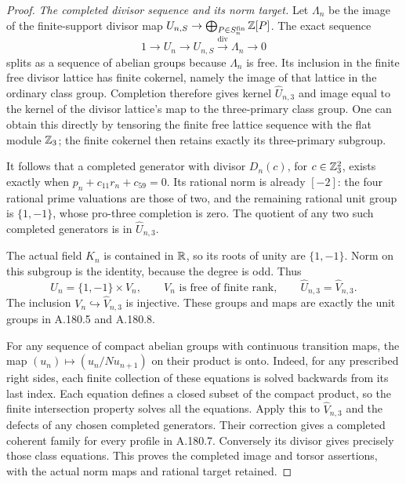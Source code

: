 \begin{proof}
\emph{The completed divisor sequence and its norm target.}
Let \(\Lambda_n\) be the image of the finite-support divisor
map \(U_{n,S}\to\bigoplus_{P\in S_n^{\rm fin}}\mathbb Z[P]\).
The exact sequence
\[
 1\longrightarrow U_n\longrightarrow U_{n,S}
                  \xrightarrow{\operatorname{div}}\Lambda_n
                  \longrightarrow0
\tag{A.180.15}
\]
splits as a sequence of abelian groups because \(\Lambda_n\)
is free.  Its inclusion in the finite free divisor lattice has
finite cokernel, namely the image of that lattice in the ordinary
class group.  Completion therefore gives kernel
\(\widehat U_{n,3}\) and image equal to the kernel of the
divisor lattice's map to the three-primary class group.  One
can obtain this directly by tensoring the finite free lattice
sequence with the flat module \(\mathbb Z_3\); the finite cokernel
then retains exactly its three-primary subgroup.

It follows that a completed generator with divisor \(D_n(c)\),
for \(c\in\mathbb Z_3^2\), exists exactly when
\(p_n+c_{11}r_n+c_{59}=0\).
Its rational norm is already \([-2]\): the four rational
prime valuations are those of two, and the remaining rational
unit group is \(\{1,-1\}\), whose pro-three completion is
zero.  The quotient of any two such completed generators is
in \(\widehat U_{n,3}\).

The actual field \(K_n\) is contained in \(\mathbb R\), so its
roots of unity are \(\{1,-1\}\).  Norm on this subgroup is
the identity, because the degree is odd.  Thus
\[
 U_n=\{1,-1\}\times V_n,
 \qquad V_n\text{ is free of finite rank},\qquad
                \widehat U_{n,3}=\widehat V_{n,3}.
\tag{A.180.16}
\]
The inclusion \(V_n\hookrightarrow\widehat V_{n,3}\)
is injective.  These groups and maps are exactly the unit
groups in A.180.5 and A.180.8.

For any sequence of compact abelian groups with continuous
transition maps, the map
\((u_n)\mapsto(u_n/Nu_{n+1})\) on their product is onto.
Indeed, for any prescribed right sides, each finite collection
of these equations is solved backwards from its last index.
Each equation defines a closed subset of the compact product,
so the finite intersection property solves all the equations.
Apply this to \(\widehat V_{n,3}\) and the defects of any
chosen completed generators.  Their correction gives a
completed coherent family for every profile in A.180.7.
Conversely its divisor gives precisely those class equations.
This proves the completed image and torsor assertions, with
the actual norm maps and rational target retained.


\end{proof}

